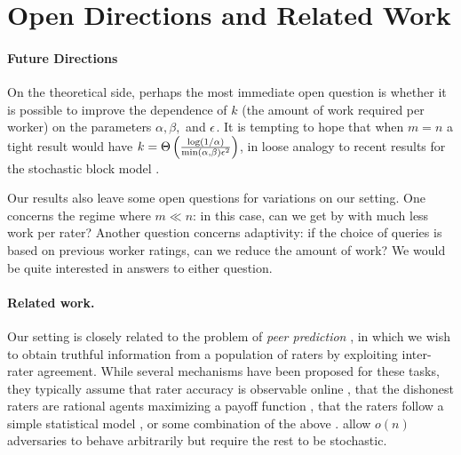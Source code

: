 \section{Open Directions and Related Work}
\label{sec:discussion}
\iffalse
\todo{fill in with lower bounds and conjectures that explain what 
``best possible'' result would look like, and how adversarial and 
stochastic settings compare}\fi

\paragraph{Future Directions}
On the theoretical side, perhaps the most immediate open question is whether it is 
possible to improve the dependence of $k$ (the amount of work required per worker) 
on the parameters $\alpha, \beta,$ and $\epsilon$.  It is tempting to hope that 
when $m = n$ a tight result would have 
$k = \Theta\left( \frac{\log(1/\alpha)}{\min (\alpha,\beta)\epsilon^2} \right)$, in loose analogy
to recent results for the stochastic block model .

Our results also leave some open questions for variations on our setting. 
One concerns the regime where $m \ll n$: in this case, can we get by 
with much less work per rater?
Another question concerns adaptivity: if the choice of queries is based 
on previous worker ratings, can we reduce the amount of work?
We would be quite interested in answers to either question.


\paragraph{Related work.}
Our setting is closely related to the problem of \emph{peer prediction} 
, in which we wish to obtain truthful information 
from a population of raters by exploiting inter-rater agreement. 
While several mechanisms have been proposed for these tasks, 
they typically assume that rater accuracy is observable online
, that the dishonest raters are 
rational agents maximizing a payoff function , that the raters follow a simple 
statistical model , or some combination of the above . 
 allow $o(n)$ adversaries 
to behave arbitrarily but require the rest to be stochastic.

